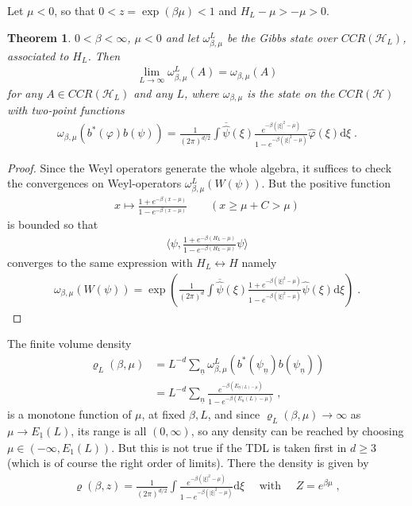 \documentclass[
a4paper, %
11pt, %
onecolumn, %
openany, %
]{memoir}
\theoremstyle{definition}
\theoremstyle{remark}
\theoremstyle{plain}
\newtheorem{theorem}[definition]{Theorem}
\begin{document}
	Let $\mu<0$, so that $0<z=\exp(\beta \mu)<1$ and $H_L-\mu>-\mu>0$.
	\begin{theorem}
		$0<\beta<\infty$, $\mu<0$ and let $\omega_{\beta,\mu}^L$ be the Gibbs state over $CCR(\mathcal{H}_L)$, associated to $H_L$. Then \begin{align}
		\lim_{L\rightarrow\infty}\omega_{\beta,\mu}^L(A)=\omega_{\beta,\mu}(A)
		\end{align}
		for any $A\in CCR(\mathcal{H}_{L})$ and any $L$, where $\omega_{\beta,\mu}$ is the state on the $CCR(\mathcal{H})$ with two-point functions \begin{align}
		\omega_{\beta,\mu}(b^*(\varphi)b(\psi))=\frac{1}{(2\pi)^{d/2}}\int \overline{\hat{\psi}}(\xi)\frac{e^{-\beta(|\xi|^2-\mu)}}{1-e^{-\beta(|\xi|^2-\mu)}}\hat{\varphi}(\xi)\mathrm{d}\xi\; .
		\end{align}
	\end{theorem}
\begin{proof}
	Since the Weyl operators generate the whole algebra, it suffices to check the convergences on Weyl-operators $\omega_{\beta,\mu}^L(W(\psi))$. But the positive function \begin{align}
	x\mapsto \frac{1+e^{-\beta(x-\mu)}}{1-e^{-\beta(x-\mu)}}\qquad (x\geq \mu+C>\mu)
	\end{align}
	is bounded so that \begin{align}
	\langle \psi, \frac{1+e^{-\beta(H_L-\mu)}}{1-e^{-\beta(H_L-\mu)}}\psi\rangle
	\end{align}
	converges to the same expression with $H_L\leftrightarrow H$ namely \begin{align}
	\omega_{\beta,\mu}(W(\psi))=\exp\left(\frac{1}{(2\pi)^d}\int \overline{\hat{\psi}}(\xi)\frac{1+e^{-\beta(|\xi|^2-\mu)}}{1-e^{-\beta(|\xi|^2-\mu)}}\hat{\psi}(\xi)\mathrm{d}\xi\right)\; .
	\end{align}
\end{proof}
The finite volume density \begin{align}
\varrho_L(\beta,\mu)&=L^{-d}\sum_{\underline{n}}\omega_{\beta,\mu}^L(b^*(\psi_{\underline{n}})b(\psi_{\underline{n}}))\\
&=L^{-d}\sum_{\underline{n}}\frac{e^{-\beta(E_{\underline{n}(L)-\mu})}}{1-e^{-\beta(E_{\underline{n}}(L)-\mu)}}\; ,
\end{align}
is a monotone function of $\mu$, at fixed $\beta, L$, and since $\varrho_L(\beta,\mu)\rightarrow\infty$ as $\mu\rightarrow E_{\underline{1}}(L)$, its range is all $(0,\infty)$, so any density can be reached by choosing $\mu\in(-\infty,E_1(L))$. But this is not true if the TDL is taken first in $d\geq 3$ (which is of course the right order of limits). There the density is given by \begin{align}
\varrho(\beta, z)=\frac{1}{(2\pi)^{d/2}} \int \frac{e^{-\beta(|\xi|^2-\mu)}}{1-e^{-\beta(|\xi|^2-\mu)}}\mathrm{d}\xi \quad\text{ with }\quad Z=e^{\beta\mu}\;,
\end{align}
\end{document}
